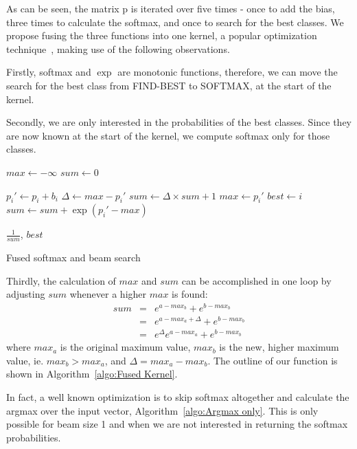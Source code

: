 \documentclass[11pt,a4paper]{article}
\begin{document}
As can be seen, the matrix p is iterated over five times - once to add the bias, three times to calculate the softmax, and once to search for the best classes. We propose fusing the three functions into one kernel, a popular optimization technique~\citep{Guevara2009EnablingTP}, making use of the following observations.

Firstly, softmax and $\exp$ are monotonic functions, therefore, we can move the search for the best class from FIND-BEST to SOFTMAX, at the start of the kernel.

Secondly, we are only interested in the probabilities of the best classes. Since they are now known at the start of the kernel, we compute softmax only for those classes.

\begin{algorithm}
\begin{algorithmic}


\State $max \gets - \infty$ 
\State $sum \gets 0$ 

  \State $p_i' \gets p_i + b_i$  
    \State $\Delta \gets max - p_i'$
    \State $sum \gets \Delta \times sum + 1 $
    \State $max \gets p_i'$
    \State $best \gets i$
  \Else
    \State $sum \gets sum + \exp(p_i' - max)$
  \EndIf
\EndFor

\Return $\frac{1}{sum}$, $best$ 

\EndProcedure
\end{algorithmic}

\caption{Fused softmax and beam search}
\label{algo:Fused Kernel}
\end{algorithm}

Thirdly, the calculation of $max$ and $sum$ can be accomplished in one loop by adjusting $sum$ whenever a higher $max$ is found:
\begin{eqnarray*}
sum & = & e^{a - max_b} + e^{b - max_b} \\
    & = & e^{a - max_a + \Delta} + e^{b - max_b} \\
    & = & e^{\Delta} e^{a - max_a} + e^{b - max_b}
\end{eqnarray*}
where $max_a$ is the original maximum value, $max_b$ is the new, higher maximum value, ie. $max_b > max_a$, and $\Delta = max_a - max_b$. The outline of our function is shown in Algorithm~\ref{algo:Fused Kernel}.

In fact, a well known optimization is to skip softmax altogether and calculate the argmax over the input vector, Algorithm~\ref{algo:Argmax only}. This is only possible for beam size 1 and when we are not interested in returning the softmax probabilities.
\end{document}
